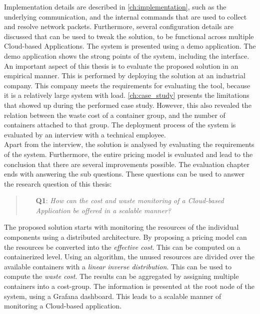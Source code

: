 \noindent
Implementation details are described in \autoref{ch:implementation}, such as the underlying communication, and the internal commands that are used to collect and resolve network packets. Furthermore, several configuration details are discussed that can be used to tweak the solution, to be functional across multiple Cloud-based Applications. The system is presented using a demo application. The demo application shows the strong points of the system, including the interface.\\

\noindent
An important aspect of this thesis is to evaluate the proposed solution in an empirical manner. This is performed by deploying the solution at an industrial company. This company meets the requirements for evaluating the tool, because it is a relatively large system with load. \autoref{ch:case_study} presents the limitations that showed up during the performed case study. However, this also revealed the relation between the waste cost of a container group, and the number of containers attached to that group. The deployment process of the system is evaluated by an interview with a technical employee.\\

\noindent
Apart from the interview, the solution is analysed by evaluating the requirements of the system. Furthermore, the entire pricing model is evaluated and lead to the conclusion that there are several improvements possible. The evaluation chapter ends with answering the sub questions. These questions can be used to answer the research question of this thesis:

\begin{quote}
    \begin{itemize}
        \item[\textbf{Q1}: ]\textit{How can the cost and waste monitoring of a Cloud-based Application be offered in a scalable manner?}
    \end{itemize}
\end{quote}

\noindent
The proposed solution starts with monitoring the resources of the individual components using a distributed architecture. By proposing a pricing model can the resources be converted into the \textit{effective cost}. This can be computed on a containerized level. Using an algorithm, the unused resources are divided over the available containers with a \textit{linear inverse distribution}. This can be used to compute the \textit{waste cost}. The results can be aggregated by assigning multiple containers into a cost-group. The information is presented at the root node of the system, using a Grafana dashboard. This leads to a scalable manner of monitoring a Cloud-based application.


